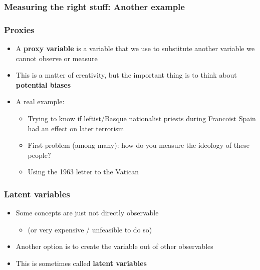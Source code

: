 \documentclass[aspectratio=43]{beamer}
\begin{document}
\begin{frame}
\frametitle{Measuring the right stuff: Another example}
\centering

{}

\end{frame}

\begin{frame}
\frametitle{Proxies}
\centering

\begin{itemize}
  \item A \textbf{proxy variable} is a variable that we use to substitute another variable we cannot observe or measure
  \item This is a matter of creativity, but the important thing is to think about \textbf{potential biases}
  \item A real example:
  \begin{itemize}
    \item Trying to know if leftist/Basque nationalist priests during Francoist Spain had an effect on later terrorism
    \item First problem (among many): how do you measure the ideology of these people?
    \item Using the 1963 letter to the Vatican
  \end{itemize}
\end{itemize}

\end{frame}

\begin{frame}
\frametitle{Latent variables}
\centering

\begin{itemize}
  \item Some concepts are just not directly observable
  \begin{itemize}
    \item (or very expensive / unfeasible to do so)
  \end{itemize}
  \item Another option is to create the variable out of other observables
  \item This is sometimes called \textbf{latent variables}
\end{itemize}

\end{frame}
\end{document}
